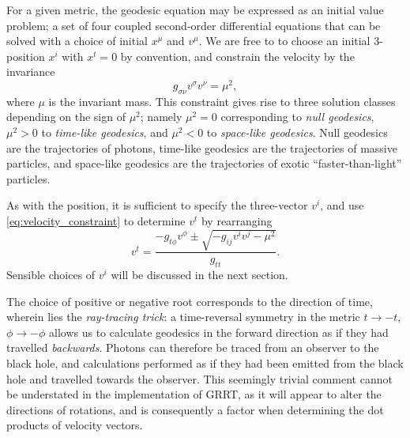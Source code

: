 \documentclass[fleqn,usenatbib]{mnras}
\newcommand{\vel}[1]{v^{#1}}
\begin{document}
For a given metric, the geodesic equation may be expressed as an initial value
problem; a set of four coupled second-order differential equations that can be
solved with a choice of initial $x^\mu$ and $\vel{\mu}$. We are free to to
choose an initial 3-position $x^i$ with $x^t = 0$ by convention, and constrain
the velocity by the invariance
\begin{equation}
\label{eq:velocity_constraint}
    g_{\sigma\nu} \vel{\sigma} \vel{\nu} = \mu^2,
\end{equation}
where $\mu$ is the invariant mass. This constraint gives rise to three solution
classes depending on the sign of $\mu^2$; namely $\mu^2 = 0$ corresponding to
\emph{null geodesics}, $\mu^2 > 0$ to \emph{time-like geodesics}, and $\mu^2 <
0$ to \emph{space-like geodesics}. Null geodesics are the trajectories of
photons, time-like geodesics are the trajectories of massive particles, and
space-like geodesics are the trajectories of exotic ``faster-than-light''
particles.

As with the position, it is sufficient to specify the three-vector $\vel{i}$,
and use \eqref{eq:velocity_constraint} to determine $\vel{t}$ by rearranging
\begin{equation}
\vel{t}  = \frac{-g_{t\phi} \vel{\phi} \pm
    \sqrt{-g_{ij} \vel{i} \vel{j} - \mu^2}
}{g_{tt}}.
\end{equation}
Sensible choices of $v^i$ will be discussed in the next section.

The choice of positive or negative root corresponds to the direction of time,
wherein lies the \textit{ray-tracing trick}: a time-reversal symmetry in the
metric $t \rightarrow -t$, $\phi \rightarrow -\phi$ allows us to calculate
geodesics in the forward direction as if they had travelled \textit{backwards}.
Photons can therefore be traced from an observer to the black hole, and
calculations performed as if they had been emitted from the black hole and
travelled towards the observer. This seemingly trivial comment cannot be
understated in the implementation of GRRT, as it will appear to alter the
directions of rotations, and is consequently a factor when determining the dot
products of velocity vectors.
\end{document}
